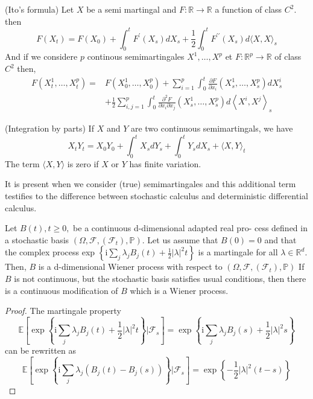 	\begin{theorem}
		(Ito's formula)
		Let $X$  be a semi martingal and $F: \mathbb{R} \rightarrow \mathbb{R}$ a function of class $C^{2} .$ then
		$$
		F\left(X_{t}\right)=F\left(X_{0}\right)+\int_{0}^{t} F^{\prime}\left(X_{s}\right) d X_{s}+\frac{1}{2} \int_{0}^{t} F^{\prime \prime}\left(X_{s}\right) d\langle X, X\rangle_{s}
		$$
		And if we considere $p$ continous semimartingales $X^{1}, \ldots, X^{p}$ et $F: \mathbb{R}^{p} \rightarrow \mathbb{R}$ of class $C^{2}$ then,
		$$
		\begin{aligned}
		F\left(X_{t}^{1}, \ldots, X_{t}^{p}\right)=& F\left(X_{0}^{1}, \ldots, X_{0}^{p}\right)+\sum_{i=1}^{p} \int_{0}^{t} \frac{\partial F}{\partial x_{i}}\left(X_{s}^{1}, \ldots, X_{s}^{p}\right) d X_{s}^{i} \\
		&+\frac{1}{2} \sum_{i, j=1}^{p} \int_{0}^{t} \frac{\partial^{2} F}{\partial x_{i} \partial x_{j}}\left(X_{s}^{1}, \ldots, X_{s}^{p}\right) d\left\langle X^{i}, X^{j}\right\rangle_{s}
		\end{aligned}
		$$
	\end{theorem}


	\begin{corollary}
		(Integration by parts) If $X$ and $Y$ are two continuous semimartingals, we have
		$$
		X_{t} Y_{t}=X_{0} Y_{0}+\int_{0}^{t} X_{s} d Y_{s}+\int_{0}^{t} Y_{s} d X_{s}+\langle X, Y\rangle_{t}
		$$
		The term $\langle X, Y\rangle$ is zero if $X$ or $Y$ has finite variation.
	\end{corollary}

	It is present when we consider (true) semimartingales and this additional term testifies to the difference between stochastic calculus and deterministic differential calculus.

	\begin{theorem}
		Let $B(t), t \geq 0,$ be a continuous d-dimensional adapted real pro-
		cess defined in a stochastic basis $\left(\Omega, \mathcal{F},\left(\mathcal{F}_{t}\right), \mathbb{P}\right) .$ Let us assume that $B(0)=0$ and that the complex process exp $\left\{\mathrm{i} \sum_{j} \lambda_{j} B_{j}(t)+\frac{1}{2}|\lambda|^{2} t\right\}$ is a martingale for all
		$\lambda \in \mathbb{R}^{d} .$ Then, $B$ is a d-dimensional Wiener process with respect to $\left(\Omega, \mathcal{F},\left(\mathcal{F}_{t}\right), \mathbb{P}\right)$
		If $B$ is not continuous, but the stochastic basis satisfies usual conditions, then there
		is a continuous modification of $B$ which is a Wiener process.
	\end{theorem}
	\begin{proof}
		The martingale property
		$$
		\mathbb{E}\left[\exp \left\{\mathrm{i} \sum_{j} \lambda_{j} B_{j}(t)+\frac{1}{2}|\lambda|^{2} t\right\} | \mathcal{F}_{s}\right]=\exp \left\{\mathrm{i} \sum_{j} \lambda_{j} B_{j}(s)+\frac{1}{2}|\lambda|^{2} s\right\}
		$$
		can be rewritten as
		$$
		\mathbb{E}\left[\exp \left\{\mathrm{i} \sum_{j} \lambda_{j}\left(B_{j}(t)-B_{j}(s)\right)\right\} | \mathcal{F}_{s}\right]=\exp \left\{-\frac{1}{2}|\lambda|^{2}(t-s)\right\}
		$$
	\end{proof}

